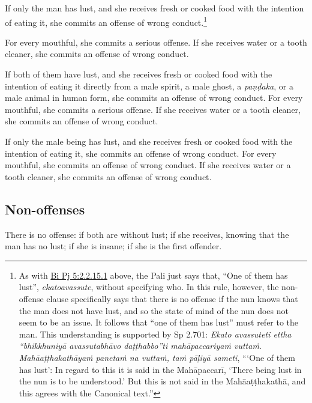 \documentclass[12pt,openany]{book}%
\begin{document}
If only the man has lust, and she receives fresh or cooked food with the intention of eating it, she commits an offense of wrong conduct.\footnote{As with  \href{https://suttacentral.net/pli-tv-bi-vb-pj5/en/brahmali\#2.2.15.1}{Bi Pj 5:2.2.15.1} above, the Pali just says that, “One of them has lust”, \textit{ekatoavassute}, without specifying who. In this rule, however, the non-offense clause specifically says that there is no offense if the nun knows that the man does not have lust, and so the state of mind of the nun does not seem to be an issue. It follows that “one of them has lust” must refer to the man. This understanding is supported by Sp 2.701: \textit{Ekato avassuteti ettha “\textsanskrit{bhikkhuniyā} \textsanskrit{avassutabhāvo} \textsanskrit{daṭṭhabbo}”ti \textsanskrit{mahāpaccariyaṁ} \textsanskrit{vuttaṁ}. \textsanskrit{Mahāaṭṭhakathāyaṁ} \textsanskrit{panetaṁ} na \textsanskrit{vuttaṁ}, \textsanskrit{taṁ} \textsanskrit{pāḷiyā} sameti}, “‘One of them has lust’: In regard to this it is said in the \textsanskrit{Mahāpaccarī}, ‘There being lust in the nun is to be understood.’ But this is not said in the \textsanskrit{Mahāaṭṭhakathā}, and this agrees with the Canonical text.” } 

For every mouthful, she commits a serious offense. If she receives water or a tooth cleaner, she commits an offense of wrong conduct. 

If both of them have lust, and she receives fresh or cooked food with the intention of eating it directly from a male spirit, a male ghost, a \textit{\textsanskrit{paṇḍaka}}, or a male animal in human form, she commits an offense of wrong conduct. For every mouthful, she commits a serious offense. If she receives water or a tooth cleaner, she commits an offense of wrong conduct. 

If only the male being has lust, and she receives fresh or cooked food with the intention of eating it, she commits an offense of wrong conduct. For every mouthful, she commits an offense of wrong conduct. If she receives water or a tooth cleaner, she commits an offense of wrong conduct. 

\subsection*{Non-offenses }

There is no offense: if both are without lust;  if she receives, knowing that the man has no lust;  if she is insane;  if she is the first offender. 
\end{document}
